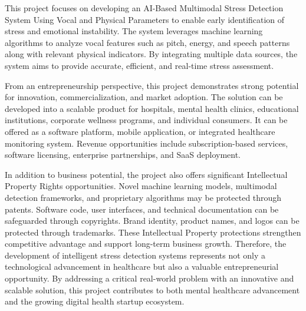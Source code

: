 This project focuses on developing an AI-Based Multimodal Stress Detection System Using Vocal and Physical Parameters to enable early identification of stress and emotional instability. The system leverages machine learning algorithms to analyze vocal features such as pitch, energy, and speech patterns along with relevant physical indicators. By integrating multiple data sources, the system aims to provide accurate, efficient, and real-time stress assessment.

From an entrepreneurship perspective, this project demonstrates strong potential for innovation, commercialization, and market adoption. The solution can be developed into a scalable product for hospitals, mental health clinics, educational institutions, corporate wellness programs, and individual consumers. It can be offered as a software platform, mobile application, or integrated healthcare monitoring system. Revenue opportunities include subscription-based services, software licensing, enterprise partnerships, and SaaS deployment.

In addition to business potential, the project also offers significant Intellectual Property Rights opportunities. Novel machine learning models, multimodal detection frameworks, and proprietary algorithms may be protected through patents. Software code, user interfaces, and technical documentation can be safeguarded through copyrights. Brand identity, product names, and logos can be protected through trademarks. These Intellectual Property protections strengthen competitive advantage and support long-term business growth. Therefore, the development of intelligent stress detection systems represents not only a technological advancement in healthcare but also a valuable entrepreneurial opportunity. By addressing a critical real-world problem with an innovative and scalable solution, this project contributes to both mental healthcare advancement and the growing digital health startup ecosystem.
